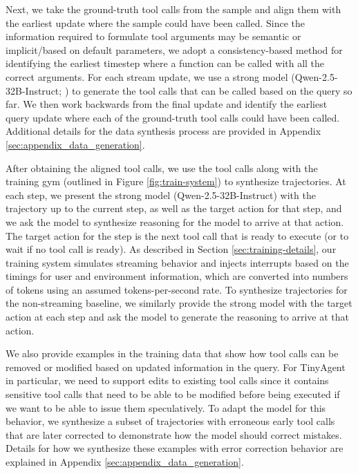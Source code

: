 Next, we take the ground-truth tool calls from the sample and align them with the earliest update where the sample could have been called.
Since the information required to formulate tool arguments may be semantic or implicit/based on default parameters, we adopt a consistency-based method for identifying the earliest timestep where a function can be called with all the correct arguments.
For each stream update, we use a strong model (Qwen-2.5-32B-Instruct; \citep{qwen2.5}) to generate the tool calls that can be called based on the query so far.
We then work backwards from the final update and identify the earliest query update where each of the ground-truth tool calls could have been called.
Additional details for the data synthesis process are provided in Appendix \ref{sec:appendix_data_generation}.

After obtaining the aligned tool calls, we use the tool calls along with the training gym (outlined in Figure \ref{fig:train-system}) to synthesize trajectories.
At each step, we present the strong model (Qwen-2.5-32B-Instruct) with the trajectory up to the current step, as well as the target action for that step, and we ask the model to synthesize reasoning for the model to arrive at that action. 
The target action for the step is the next tool call that is ready to execute (or to wait if no tool call is ready).
As described in Section \ref{sec:training-details}, our training system simulates streaming behavior and injects interrupts based on the timings for user and environment information, which are converted into numbers of tokens using an assumed tokens-per-second rate.
To synthesize trajectories for the non-streaming baseline, we similarly provide the strong model with the target action at each step and ask the model to generate the reasoning to arrive at that action.

We also provide examples in the training data that show how tool calls can be removed or modified based on updated information in the query.
For TinyAgent in particular, we need to support edits to existing tool calls since it contains sensitive tool calls that need to be able to be modified before being executed if we want to be able to issue them speculatively. 
To adapt the model for this behavior, we synthesize a subset of trajectories with erroneous early tool calls that are later corrected to demonstrate how the model should correct mistakes.
Details for how we synthesize these examples with error correction behavior are explained in Appendix \ref{sec:appendix_data_generation}.
